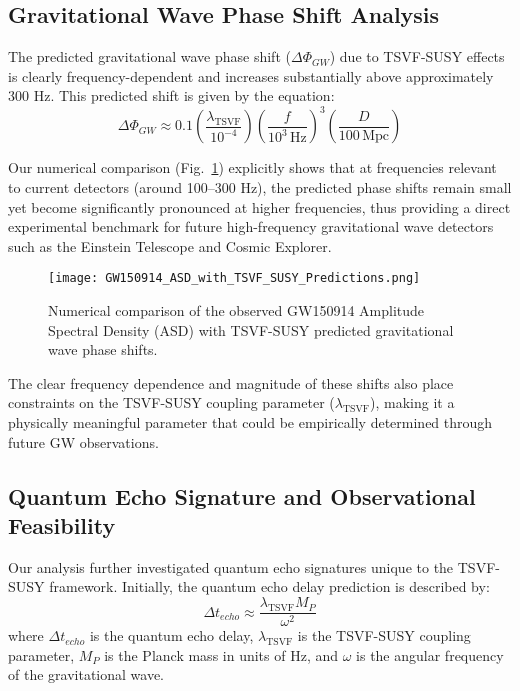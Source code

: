 \documentclass[twocolumn,superscriptaddress,floatfix]{revtex4-2}
\begin{document}
\subsection{Gravitational Wave Phase Shift Analysis}\label{subsec:gw_phase_shift_analysis}
The predicted gravitational wave phase shift ($\Delta \Phi_{GW}$) due to TSVF-SUSY effects is clearly frequency-dependent and increases substantially above approximately 300 Hz. This predicted shift is given by the equation:
\begin{equation}\label{eq:gw_phase_shift}
\Delta \Phi_{GW} \approx 0.1 \left(\frac{\lambda_{\text{TSVF}}}{10^{-4}}\right) \left(\frac{f}{10^{3}\,\text{Hz}}\right)^3 \left(\frac{D}{100\,\text{Mpc}}\right)
\end{equation}

Our numerical comparison (Fig.~\ref{fig:phase_shift_comparison}) explicitly shows that at frequencies relevant to current detectors (around 100--300 Hz), the predicted phase shifts remain small yet become significantly pronounced at higher frequencies, thus providing a direct experimental benchmark for future high-frequency gravitational wave detectors such as the Einstein Telescope and Cosmic Explorer.

\begin{figure}[htbp]
\centering
\texttt{[image: GW150914\_ASD\_with\_TSVF\_SUSY\_Predictions.png]}
\caption{Numerical comparison of the observed GW150914 Amplitude Spectral Density (ASD) with TSVF-SUSY predicted gravitational wave phase shifts.}
\label{fig:phase_shift_comparison}
\end{figure}

The clear frequency dependence and magnitude of these shifts also place constraints on the TSVF-SUSY coupling parameter ($\lambda_{\text{TSVF}}$), making it a physically meaningful parameter that could be empirically determined through future GW observations.

\subsection{Quantum Echo Signature and Observational Feasibility}\label{subsec:quantum_echo_signature}
Our analysis further investigated quantum echo signatures unique to the TSVF-SUSY framework. Initially, the quantum echo delay prediction is described by:
\begin{equation}\label{eq:quantum_echo_delay}
\Delta t_{echo} \approx \frac{\lambda_{\text{TSVF}} M_P}{\omega^2}
\end{equation}
where $\Delta t_{echo}$ is the quantum echo delay, $\lambda_{\text{TSVF}}$ is the TSVF-SUSY coupling parameter, $M_P$ is the Planck mass in units of Hz, and $\omega$ is the angular frequency of the gravitational wave.
\end{document}
